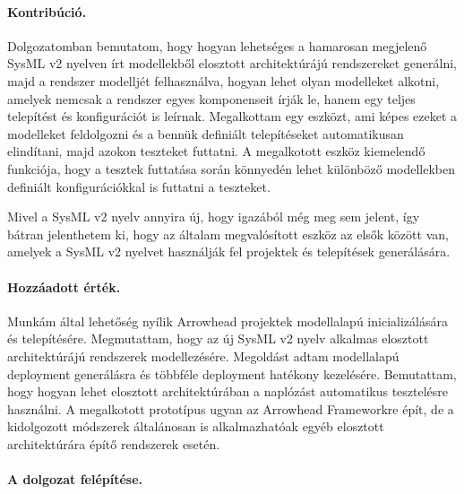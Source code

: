 \paragraph{Kontribúció.}
Dolgozatomban bemutatom, hogy hogyan lehetséges a hamarosan megjelenő SysML v2 nyelven írt modellekből elosztott architektúrájú rendszereket generálni, majd a rendszer modelljét felhasználva, hogyan lehet olyan modelleket alkotni, amelyek nemcsak a rendszer egyes komponenseit írják le, hanem egy teljes telepítést és konfigurációt is leírnak. Megalkottam egy eszközt, ami képes ezeket a modelleket feldolgozni és a bennük definiált telepítéseket automatikusan elindítani, majd azokon teszteket futtatni. A megalkotott eszköz kiemelendő funkciója, hogy a tesztek futtatása során könnyedén lehet különböző modellekben definiált konfigurációkkal is futtatni a teszteket.

Mivel a SysML v2 nyelv annyira új, hogy igazából még meg sem jelent, így bátran jelenthetem ki, hogy az általam megvalósított eszköz az elsők között van, amelyek a SysML v2 nyelvet használják fel projektek és telepítések generálására.

\paragraph{Hozzáadott érték.}

Munkám által lehetőség nyílik Arrowhead projektek modellalapú inicializálására és telepítésére. Megmutattam, hogy az új SysML v2 nyelv alkalmas elosztott architektúrájú rendszerek modellezésére. Megoldást adtam modellalapú deployment generálásra és többféle deployment hatékony kezelésére. Bemutattam, hogy hogyan lehet elosztott architektúrában a naplózást automatikus tesztelésre használni. A megalkotott prototípus ugyan az Arrowhead Frameworkre épít, de a kidolgozott módszerek általánosan is alkalmazhatóak egyéb elosztott architektúrára építő rendszerek esetén.

\paragraph{A dolgozat felépítése.}

